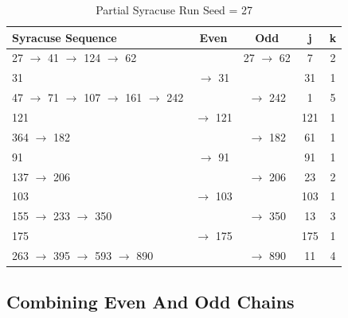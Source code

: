 \documentclass[preprint]{sigplanconf}
\begin{document}
\begin{table} [ht]
    \begin{center}
        \begin{tabular}{|l|c|c|c|c|}
            \hline
            \textbf{Syracuse Sequence}                & \textbf{Even} & \textbf{Odd} & \textbf{j} & \textbf{k} \\
            \hline
            27 $\to$ 41 $\to$ 124 $\to$ 62            &               & 27 $\to$ 62  & 7          & 2          \\
            \hline
            31                                        & $\to$ 31      &              & 31         & 1          \\
            \hline
            47 $\to$ 71 $\to$ 107 $\to$ 161 $\to$ 242 &               & $\to$ 242    & 1          & 5          \\
            \hline
            121                                       & $\to$ 121     &              & 121        & 1          \\
            \hline
            364 $\to$ 182                             &               & $\to$ 182    & 61         & 1          \\
            \hline
            91                                        & $\to$ 91      &              & 91         & 1          \\
            \hline
            137 $\to$ 206                             &               & $\to$ 206    & 23         & 2          \\
            \hline
            103                                       & $\to$ 103     &              & 103        & 1          \\
            \hline
            155 $\to$ 233 $\to$ 350                   &               & $\to$ 350    & 13         & 3          \\
            \hline
            175                                       & $\to$ 175     &              & 175        & 1          \\
            \hline
            263 $\to$ 395 $\to$ 593 $\to$ 890         &               & $\to$ 890    & 11         & 4          \\
            \hline
        \end{tabular}
        \caption{Partial Syracuse Run Seed = 27}
        \label{tab-1}
    \end{center}
\end{table}

\subsection{Combining Even And Odd Chains}
\end{document}
